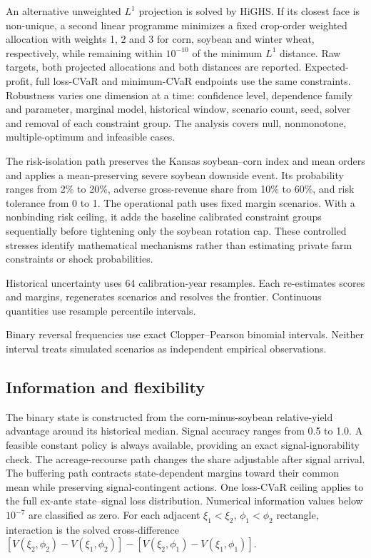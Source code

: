 An alternative unweighted \(L^1\) projection is solved by HiGHS. If its closest
face is non-unique, a second linear programme minimizes a fixed crop-order
weighted allocation with weights 1, 2 and 3 for corn, soybean and winter wheat,
respectively, while remaining within \(10^{-10}\) of the minimum \(L^1\)
distance. Raw targets, both projected allocations and both distances are
reported. Expected-profit, full loss-CVaR and minimum-CVaR endpoints use the
same constraints. Robustness varies one dimension at a time: confidence
level, dependence family and parameter, marginal model, historical window,
scenario count, seed, solver and removal of each constraint group. The
analysis covers null, nonmonotone, multiple-optimum and infeasible cases.

The risk-isolation path preserves the Kansas soybean--corn index and mean
orders and applies a mean-preserving severe soybean downside event. Its
probability ranges from 2\% to 20\%, adverse gross-revenue share from 10\% to
60\%, and risk tolerance from 0 to 1. The operational path uses fixed margin
scenarios. With a nonbinding risk ceiling, it adds the baseline calibrated
constraint groups sequentially before tightening only the soybean rotation
cap. These controlled stresses identify mathematical mechanisms rather than
estimating private farm constraints or shock probabilities.

Historical uncertainty uses 64 calibration-year resamples. Each re-estimates
scores and margins, regenerates scenarios and resolves the frontier.
Continuous quantities use resample percentile intervals.

Binary reversal frequencies use exact Clopper--Pearson binomial intervals.
Neither interval treats simulated scenarios as independent empirical
observations.

\subsection{Information and flexibility}

The binary state is constructed from the corn-minus-soybean relative-yield
advantage around its historical median. Signal accuracy ranges from 0.5 to
1.0. A feasible constant policy is always available, providing an exact
signal-ignorability check. The acreage-recourse path changes the share
adjustable after signal arrival. The buffering path contracts state-dependent
margins toward their common mean while preserving signal-contingent actions.
One loss-CVaR ceiling applies to the full ex-ante state--signal loss
distribution. Numerical information values below \(10^{-7}\) are classified
as zero. For each adjacent \(\xi_1<\xi_2\), \(\phi_1<\phi_2\) rectangle,
interaction is the solved cross-difference
\([V(\xi_2,\phi_2)-V(\xi_1,\phi_2)]-
[V(\xi_2,\phi_1)-V(\xi_1,\phi_1)]\).

